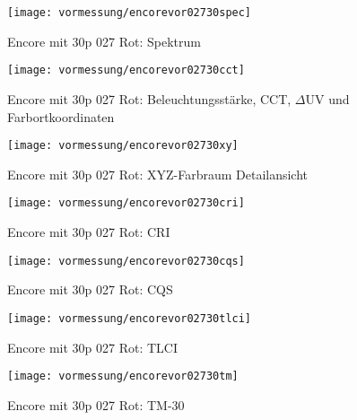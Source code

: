 \documentclass[pagesize,paper=A4,fontsize=12pt,utf8,numbers=noenddot,bibliography=totoc,listof=totoc,DIV=11,BCOR=1mm]{scrreprt}
\begin{document}
\begin{figure}[htp]     %
\centering
\texttt{[image: vormessung/encorevor02730spec]} 
\caption {Encore mit 30p 027 Rot: Spektrum} 
\end{figure}

\begin{figure}[htp]     %
\centering
\texttt{[image: vormessung/encorevor02730cct]} 
\caption {Encore mit 30p 027 Rot: Beleuchtungsstärke, CCT, $\Delta$UV und Farbortkoordinaten} 
\end{figure}

\begin{figure}[htp]     %
\centering
\texttt{[image: vormessung/encorevor02730xy]} 
\caption {Encore mit 30p 027 Rot: XYZ-Farbraum Detailansicht} 
\end{figure}

\begin{figure}[htp]     %
\centering
\texttt{[image: vormessung/encorevor02730cri]} 
\caption {Encore mit 30p 027 Rot: CRI} 
\end{figure}

\begin{figure}[htp]     %
\centering
\texttt{[image: vormessung/encorevor02730cqs]} 
\caption {Encore mit 30p 027 Rot: CQS} 
\end{figure}

\begin{figure}[htp]     %
\centering
\texttt{[image: vormessung/encorevor02730tlci]} 
\caption {Encore mit 30p 027 Rot: TLCI} 
\end{figure}

\begin{figure}[htp]     %
\centering
\texttt{[image: vormessung/encorevor02730tm]} 
\caption {Encore mit 30p 027 Rot: TM-30} 
\end{figure}
\end{document}
